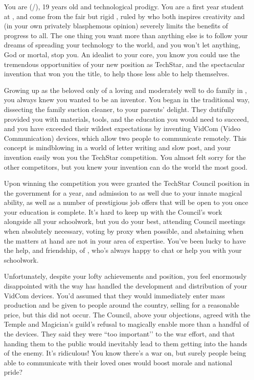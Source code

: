\documentclass[char]{GL2020}
\begin{document}
\name{\cTechStar{}}


You are \cTechStar{} (\cTechStar{\they}/\cTechStar{\them}), 19 years old and technological prodigy.  You are a first year student at \pSchool{}, and come from the fair but rigid \pTech{}, ruled by \cTechGod{} who both inspires creativity and (in your own privately blasphemous opinion) severely limits the benefits of progress to all. The one thing you want more than anything else is to follow your dreams of spreading your technology to the world, and you won’t let anything, God or mortal, stop you.  An idealist to your core, you know you could use the tremendous opportunities of your new position as TechStar, and the spectacular invention that won you the title, to help those less able to help themselves.

Growing up as the beloved only \cTechStar{\child} of a loving and moderately well to do family in \pTech{}, you always knew you wanted to be an inventor.  You began in the traditional way, dissecting the family suction cleaner, to your parents’ delight.  They dutifully provided you with materials, tools, and the education you would need to succeed, and you have exceeded their wildest expectations by inventing VidCom (Video Communication) devices, which allow two people to communicate remotely.  This concept is mindblowing in a world of letter writing and slow post, and your invention easily won you the TechStar competition. You almost felt sorry for the other competitors, but you knew your invention can do the world the most good.  

Upon winning the competition you were granted the TechStar Council position in the government for a year, and admission to \pSchool{} as well due to your innate magical ability, as well as a number of prestigious job offers that will be open to you once your education is complete. It’s hard to keep up with the Council’s work alongside all your schoolwork, but you do your best, attending Council meetings when absolutely necessary, voting by proxy when possible, and abstaining when the matters at hand are not in your area of expertise. You’ve been lucky to have the help, and friendship, of \cScholarship{}, who’s always happy to chat or help you with your schoolwork.

Unfortunately, despite your lofty achievements and position, you feel enormously disappointed with the way \pTech{} has handled the development and distribution of your VidCom devices.  You’d assumed that they would immediately enter mass production and be given to people around the country, selling for a reasonable price, but this did not occur. The Council, above your objections, agreed with the Temple and Magician’s guild’s refusal to magically enable more than a handful of the devices. They said they were ``too important’’ to the war effort, and that handing them to the public would inevitably lead to them getting into the hands of the enemy.  It’s ridiculous!  You know there’s a war on, but surely people being able to communicate with their loved ones would boost morale and national pride?
\end{document}

